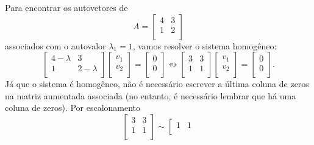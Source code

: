 \begin{ex}
	Para encontrar os autovetores de
	\begin{equation}
	A =
	\left[
	\begin{array}{cc}
	4 & 3 \\
	1 & 2 \\
	\end{array}
	\right]
	\end{equation} associados com o autovalor $\lambda_1 = 1$, vamos resolver o sistema homogêneo:
	\begin{equation}
	\left[
	\begin{array}{cc}
	4-\lambda & 3 \\
	1 & 2-\lambda \\
	\end{array}
	\right] \left[
	\begin{array}{c}
	v_1 \\
	v_2 \\
	\end{array}
	\right] = \left[
	\begin{array}{c}
	0 \\
	0 \\
	\end{array}
	\right] \leftrightsquigarrow
	\left[
	\begin{array}{cc}
	3 & 3 \\
	1 & 1 \\
	\end{array}
	\right] \left[
	\begin{array}{c}
	v_1 \\
	v_2 \\
	\end{array}
	\right] = \left[
	\begin{array}{c}
	0 \\
	0 \\
	\end{array}
	\right].
	\end{equation} Já que o sistema é homogêneo, não é necessário escrever a última coluna de zeros na matriz aumentada associada (no entanto, é necessário lembrar que há uma coluna de zeros). Por escalonamento
	\begin{equation}
	\left[
	\begin{array}{cc}
	3 & 3 \\
	1 & 1 \\
	\end{array}
	\right] \sim
	\left[
	\begin{array}{cc}
	1 & 1 \\

\end{array}
\end{equation}
\end{ex}
